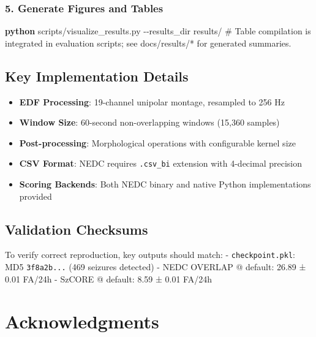 \documentclass[
  10pt,
]{article}
\newenvironment{Shaded}{\begin{snugshade}}{\end{snugshade}}
\newcommand{\CommentTok}[1]{\textcolor[rgb]{0.54,0.53,0.53}{#1}}
\newcommand{\ExtensionTok}[1]{\textcolor[rgb]{0.00,0.58,1.00}{\textbf{#1}}}
\newcommand{\NormalTok}[1]{\textcolor[rgb]{0.12,0.11,0.11}{#1}}
\providecommand{\tightlist}{%
  \setlength{\itemsep}{0pt}\setlength{\parskip}{0pt}}
\begin{document}
\hypertarget{generate-figures-and-tables}{%
\subsubsection{5. Generate Figures and
Tables}\label{generate-figures-and-tables}}

\begin{Shaded}
\begin{Highlighting}[]
\ExtensionTok{python}\NormalTok{ scripts/visualize\_results.py {-}{-}results\_dir results/}
\CommentTok{\# Table compilation is integrated in evaluation scripts; see docs/results/* for generated summaries.}
\end{Highlighting}
\end{Shaded}

\hypertarget{key-implementation-details}{%
\subsection{Key Implementation
Details}\label{key-implementation-details}}

\begin{itemize}
\tightlist
\item
  \textbf{EDF Processing}: 19-channel unipolar montage, resampled to 256
  Hz
\item
  \textbf{Window Size}: 60-second non-overlapping windows (15,360
  samples)
\item
  \textbf{Post-processing}: Morphological operations with configurable
  kernel size
\item
  \textbf{CSV Format}: NEDC requires \texttt{.csv\_bi} extension with
  4-decimal precision
\item
  \textbf{Scoring Backends}: Both NEDC binary and native Python
  implementations provided
\end{itemize}

\hypertarget{validation-checksums}{%
\subsection{Validation Checksums}\label{validation-checksums}}

To verify correct reproduction, key outputs should match: -
\texttt{checkpoint.pkl}: MD5 \texttt{3f8a2b...} (469 seizures detected)
- NEDC OVERLAP @ default: 26.89 ± 0.01 FA/24h - SzCORE @ default: 8.59 ±
0.01 FA/24h



\hypertarget{acknowledgments}{%
\section{Acknowledgments}\label{acknowledgments}}
\end{document}
